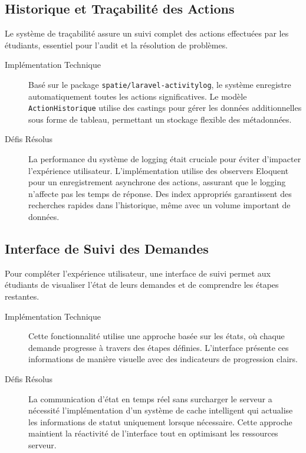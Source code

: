 \documentclass[12pt,a4paper]{report}
\begin{document}
\subsection{Historique et Traçabilité des Actions}

Le système de traçabilité assure un suivi complet des actions effectuées par les étudiants, essentiel pour l'audit et la résolution de problèmes.

\begin{description}
\item[Implémentation Technique] Basé sur le package \texttt{spatie/laravel-activitylog}, le système enregistre automatiquement toutes les actions significatives. Le modèle \texttt{ActionHistorique} utilise des castings pour gérer les données additionnelles sous forme de tableau, permettant un stockage flexible des métadonnées.

\item[Défis Résolus] La performance du système de logging était cruciale pour éviter d'impacter l'expérience utilisateur. L'implémentation utilise des observers Eloquent pour un enregistrement asynchrone des actions, assurant que le logging n'affecte pas les temps de réponse. Des index appropriés garantissent des recherches rapides dans l'historique, même avec un volume important de données.
\end{description}

\subsection{Interface de Suivi des Demandes}

Pour compléter l'expérience utilisateur, une interface de suivi permet aux étudiants de visualiser l'état de leurs demandes et de comprendre les étapes restantes.

\begin{description}
\item[Implémentation Technique] Cette fonctionnalité utilise une approche basée sur les états, où chaque demande progresse à travers des étapes définies. L'interface présente ces informations de manière visuelle avec des indicateurs de progression clairs.

\item[Défis Résolus] La communication d'état en temps réel sans surcharger le serveur a nécessité l'implémentation d'un système de cache intelligent qui actualise les informations de statut uniquement lorsque nécessaire. Cette approche maintient la réactivité de l'interface tout en optimisant les ressources serveur.
\end{description}
\end{document}
